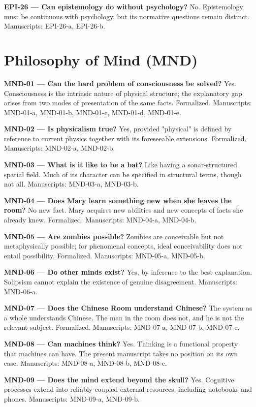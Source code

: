 \documentclass[10pt]{article}
\begin{document}
\textbf{EPI-26 --- Can epistemology do without psychology?} No. Epistemology must be continuous with psychology, but its normative questions remain distinct. Manuscripts: EPI-26-a, EPI-26-b.

\section*{Philosophy of Mind (MND)}
\textbf{MND-01 --- Can the hard problem of consciousness be solved?} Yes. Consciousness is the intrinsic nature of physical structure; the explanatory gap arises from two modes of presentation of the same facts. Formalized. Manuscripts: MND-01-a, MND-01-b, MND-01-c, MND-01-d, MND-01-e.

\textbf{MND-02 --- Is physicalism true?} Yes, provided "physical" is defined by reference to current physics together with its foreseeable extensions. Formalized. Manuscripts: MND-02-a, MND-02-b.

\textbf{MND-03 --- What is it like to be a bat?} Like having a sonar-structured spatial field. Much of its character can be specified in structural terms, though not all. Manuscripts: MND-03-a, MND-03-b.

\textbf{MND-04 --- Does Mary learn something new when she leaves the room?} No new fact. Mary acquires new abilities and new concepts of facts she already knew. Formalized. Manuscripts: MND-04-a, MND-04-b.

\textbf{MND-05 --- Are zombies possible?} Zombies are conceivable but not metaphysically possible; for phenomenal concepts, ideal conceivability does not entail possibility. Formalized. Manuscripts: MND-05-a, MND-05-b.

\textbf{MND-06 --- Do other minds exist?} Yes, by inference to the best explanation. Solipsism cannot explain the existence of genuine disagreement. Manuscripts: MND-06-a.

\textbf{MND-07 --- Does the Chinese Room understand Chinese?} The system as a whole understands Chinese. The man in the room does not, and he is not the relevant subject. Formalized. Manuscripts: MND-07-a, MND-07-b, MND-07-c.

\textbf{MND-08 --- Can machines think?} Yes. Thinking is a functional property that machines can have. The present manuscript takes no position on its own case. Manuscripts: MND-08-a, MND-08-b, MND-08-c.

\textbf{MND-09 --- Does the mind extend beyond the skull?} Yes. Cognitive processes extend into reliably coupled external resources, including notebooks and phones. Manuscripts: MND-09-a, MND-09-b.
\end{document}
